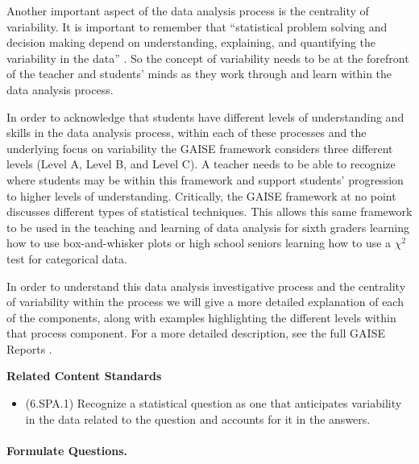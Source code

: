 \documentclass[
]{book}
\providecommand{\tightlist}{%
  \setlength{\itemsep}{0pt}\setlength{\parskip}{0pt}}
\newenvironment{standards}{}{}
\theoremstyle{definition}
\theoremstyle{definition}
\theoremstyle{definition}
\theoremstyle{definition}
\theoremstyle{remark}
\begin{document}
Another important aspect of the data analysis process is the centrality of variability. It is important to remember that ``statistical problem solving and decision making depend on understanding, explaining, and quantifying the variability in the data'' \citep[p.~6]{GAISE}. So the concept of variability needs to be at the forefront of the teacher and students' minds as they work through and learn within the data analysis process.

In order to acknowledge that students have different levels of understanding and skills in the data analysis process, within each of these processes and the underlying focus on variability the GAISE framework considers three different levels (Level A, Level B, and Level C). A teacher needs to be able to recognize where students may be within this framework and support students' progression to higher levels of understanding. Critically, the GAISE framework at no point discusses different types of statistical techniques. This allows this same framework to be used in the teaching and learning of data analysis for sixth graders learning how to use box-and-whisker plots or high school seniors learning how to use a \(\chi^2\) test for categorical data.

In order to understand this data analysis investigative process and the centrality of variability within the process we will give a more detailed explanation of each of the components, along with examples highlighting the different levels within that process component. For a more detailed description, see the full GAISE Reports \citep{GAISE, GAISE2}.

\begin{standards}

\begin{center}
\textbf{Related Content Standards}

\end{center}

\begin{itemize}
\tightlist
\item
  (6.SPA.1) Recognize a statistical question as one that anticipates variability in the data related to the question and accounts for it in the answers.
\end{itemize}

\end{standards}

\hypertarget{formulate-questions.}{%
\paragraph*{Formulate Questions.}\label{formulate-questions.}}
\end{document}
